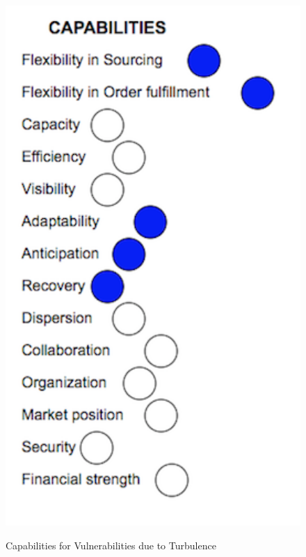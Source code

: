 \begin{figure}[H]
  \centering
  \includegraphics[width=4.5in]{figures/V1.png}\\
  \caption{Capabilities for Vulnerabilities due to Turbulence}\label{V1}
\end{figure}  


